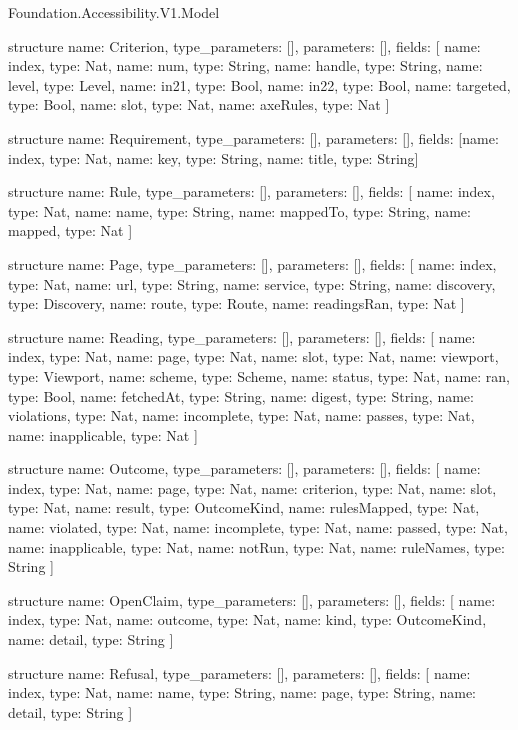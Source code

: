 \begin{lexlean}{Foundation.Accessibility.V1.Model}
\begin{semanticmodule}
structure{
  name: Criterion,
  type_parameters: [],
  parameters: [],
  fields: [
    {name: index, type: Nat},
    {name: num, type: String},
    {name: handle, type: String},
    {name: level, type: Level},
    {name: in21, type: Bool},
    {name: in22, type: Bool},
    {name: targeted, type: Bool},
    {name: slot, type: Nat},
    {name: axeRules, type: Nat}
  ]
}

structure{
  name: Requirement,
  type_parameters: [],
  parameters: [],
  fields: [{name: index, type: Nat}, {name: key, type: String}, {name: title, type: String}]
}

structure{
  name: Rule,
  type_parameters: [],
  parameters: [],
  fields: [
    {name: index, type: Nat},
    {name: name, type: String},
    {name: mappedTo, type: String},
    {name: mapped, type: Nat}
  ]
}

structure{
  name: Page,
  type_parameters: [],
  parameters: [],
  fields: [
    {name: index, type: Nat},
    {name: url, type: String},
    {name: service, type: String},
    {name: discovery, type: Discovery},
    {name: route, type: Route},
    {name: readingsRan, type: Nat}
  ]
}

structure{
  name: Reading,
  type_parameters: [],
  parameters: [],
  fields: [
    {name: index, type: Nat},
    {name: page, type: Nat},
    {name: slot, type: Nat},
    {name: viewport, type: Viewport},
    {name: scheme, type: Scheme},
    {name: status, type: Nat},
    {name: ran, type: Bool},
    {name: fetchedAt, type: String},
    {name: digest, type: String},
    {name: violations, type: Nat},
    {name: incomplete, type: Nat},
    {name: passes, type: Nat},
    {name: inapplicable, type: Nat}
  ]
}

structure{
  name: Outcome,
  type_parameters: [],
  parameters: [],
  fields: [
    {name: index, type: Nat},
    {name: page, type: Nat},
    {name: criterion, type: Nat},
    {name: slot, type: Nat},
    {name: result, type: OutcomeKind},
    {name: rulesMapped, type: Nat},
    {name: violated, type: Nat},
    {name: incomplete, type: Nat},
    {name: passed, type: Nat},
    {name: inapplicable, type: Nat},
    {name: notRun, type: Nat},
    {name: ruleNames, type: String}
  ]
}

structure{
  name: OpenClaim,
  type_parameters: [],
  parameters: [],
  fields: [
    {name: index, type: Nat},
    {name: outcome, type: Nat},
    {name: kind, type: OutcomeKind},
    {name: detail, type: String}
  ]
}

structure{
  name: Refusal,
  type_parameters: [],
  parameters: [],
  fields: [
    {name: index, type: Nat},
    {name: name, type: String},
    {name: page, type: String},
    {name: detail, type: String}
  ]
}


\end{semanticmodule}
\end{lexlean}
